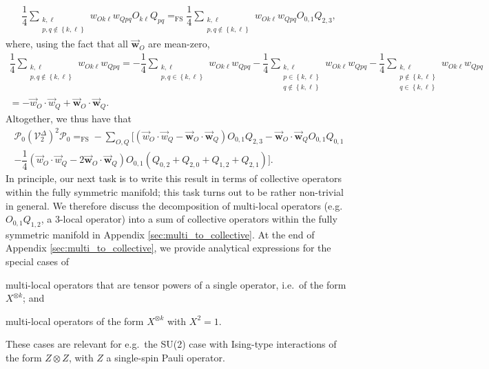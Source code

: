 \documentclass[nofootinbib,notitlepage,11pt]{revtex4-2}
\newcommand{\f}[2]{\dfrac{#1}{#2}} %
\newcommand{\p}[1]{\left(#1\right)} %
\renewcommand{\set}[1]{\left\{#1\right\}} %
\renewcommand{\c}{\cdot} %
\newcommand{\m}{\bm} %
\renewcommand{\v}{\vec} %
\newcommand{\1}{\mathds{1}}
\renewcommand{\P}{\mathcal{P}}
\newcommand{\V}{\mathcal{V}}
\newcommand{\EQFS}{=_{\text{FS}}}
\begin{document}
\begin{align}
  \f14 \sum_{\substack{k,\ell\\p,q\notin\set{k,\ell}}}
  w_{Ok\ell} w_{Qpq} O_{k\ell} Q_{pq}
  \EQFS \f14 \sum_{\substack{k,\ell\\p,q\notin\set{k,\ell}}}
  w_{Ok\ell} w_{Qpq} O_{0,1} Q_{2,3},
\end{align}
where, using the fact that all $\v{\m w}_O$ are mean-zero,
\begin{multline}
  \f14 \sum_{\substack{k,\ell\\p,q\notin\set{k,\ell}}} w_{Ok\ell} w_{Qpq}
  = - \f14 \sum_{\substack{k,\ell\\p,q\in\set{k,\ell}}} w_{Ok\ell} w_{Qpq}
  - \f14 \sum_{\substack{k,\ell\\p\in\set{k,\ell}\\q\notin\set{k,\ell}}}
  w_{Ok\ell} w_{Qpq}
  - \f14 \sum_{\substack{k,\ell\\p\notin\set{k,\ell}\\q\in\set{k,\ell}}}
  w_{Ok\ell} w_{Qpq} \\
  = -\v w_O \c \v w_Q + \v{\m w}_O \c \v{\m w}_Q.
\end{multline}
Altogether, we thus have that
\begin{multline}
  \P_0 \p{\V_2^\Delta}^2 \P_0
  \EQFS - \sum_{O,Q} \bigg[
  \p{\v w_O \c \v w_Q - \v{\m w}_O \c \v{\m w}_Q} O_{0,1} Q_{2,3}
  - \v{\m w}_O \c \v{\m w}_Q O_{0,1} Q_{0,1} \\
  -\f14 \p{\v w_O\c\v w_Q - 2 \v{\m w}_O \c \v{\m w}_Q}
  O_{0,1} \p{Q_{0,2} + Q_{2,0} + Q_{1,2} + Q_{2,1}} \bigg].
  \label{eq:POQP}
\end{multline}
In principle, our next task is to write this result in terms of
collective operators within the fully symmetric manifold; this task
turns out to be rather non-trivial in general.  We therefore discuss
the decomposition of multi-local operators (e.g.~$O_{0,1} Q_{1,2}$, a
3-local operator) into a sum of collective operators within the fully
symmetric manifold in Appendix \ref{sec:multi_to_collective}.  At the
end of Appendix \ref{sec:multi_to_collective}, we provide analytical
expressions for the special cases of
\begin{enumerate*}
\item multi-local operators that are tensor powers of a single
  operator, i.e.~of the form $X^{\otimes k}$; and
\item multi-local operators of the form $X^{\otimes k}$ with $X^2=1$.
\end{enumerate*}
These cases are relevant for e.g.~the SU(2) case with Ising-type
interactions of the form $Z\otimes Z$, with $Z$ a single-spin Pauli
operator.
\end{document}
